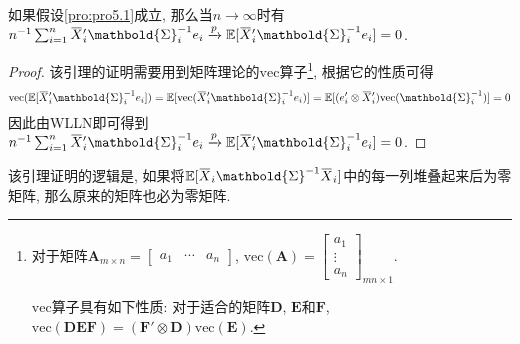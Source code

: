 \documentclass[cn, 12pt, math=mtpro2, bibstyle=apa, blue, twocol]{elegantbook}
\newcommand{\E}{\mathbb{E}}
\newcommand{\overbar}[1]{\mkern 1.5mu\overline{\mkern-1.5mu#1\mkern-1.5mu}\mkern 1.5mu}
\begin{document}
\begin{lemma}\label{lem:lem5.1}
如果假设\ref{pro:pro5.1}成立, 那么当$n\to\infty$时有$n^ {-1}\sum_{i=1}^{n}\overbar{X}_i'\mathbold{\Sigma}^{-1}_ie_i\xrightarrow{p}\E[\overbar{X}_i'\mathbold{\Sigma}_i^{-1}e_i]=0$.
\end{lemma}
\begin{proof}
  该引理的证明需要用到矩阵理论的$\text{vec}$算子\footnote{对于矩阵$\mathbold{A}_{m\times n}=\begin{bmatrix}
                                                                   a_1 & \cdots & a_n
                                                                 \end{bmatrix}$, $\text{vec}(\mathbold{A})=\begin{bmatrix}
                                                                                             a_1 \\
                                                                                             \vdots \\
                                                                                             a_n
                                                                                           \end{bmatrix}_{mn\times1}$.

\vbox{}

\noindent $\text{vec}$算子具有如下性质: 对于适合的矩阵$\mathbold{D}$, $\mathbold{E}$和$\mathbold{F}$, $\text{vec}(\mathbold{DEF})=(\mathbold{F}'\otimes \mathbold{D})\text{vec}(\mathbold{E})$.}, 根据它的性质可得
  $$\text{vec}(\E[\overbar{X}_i'\mathbold{\Sigma}_i^{-1}e_i])=\E[\text{vec}(\overbar{X}_i'\mathbold{\Sigma}_i^{-1}e_i)]=\E[(e_i'\otimes\overbar{X}_i')\text{vec}(\mathbold{\Sigma}_i^{-1})]=0$$
  因此由WLLN即可得到
  $n^ {-1}\sum_{i=1}^{n}\overbar{X}_i'\mathbold{\Sigma}_i^{-1}e_i\xrightarrow{p}\E[\overbar{X}_i'\mathbold{\Sigma}_i^{-1}e_i]=0$.
\end{proof}
\begin{remark}
该引理证明的逻辑是, 如果将$\E[\overbar{X}_i\mathbold{\Sigma}^{-1}\overbar{X}_i]$中的每一列堆叠起来后为零矩阵, 那么原来的矩阵也必为零矩阵.
\end{remark}
\end{document}
